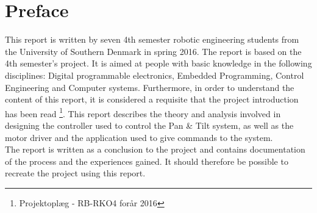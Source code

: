 \section*{Preface}

This report is written by seven 4th semester robotic engineering students from the University of Southern Denmark in spring 2016. The report is based on the 4th semester's project.
It is aimed at people with basic knowledge in the following disciplines: Digital programmable electronics, Embedded Programming, Control Engineering and Computer systems. Furthermore, in order to understand the content of this report, it is considered a requisite that the project introduction has been read \footnote{Projektoplæg - RB-RKO4 forår 2016}.
This report describes the theory and analysis involved in designing the controller used to control the Pan \& Tilt system, as well as the motor driver and the application used to give commands to the system.\\
The report is written as a conclusion to the project and contains documentation of the process and the experiences gained. It should therefore be possible to recreate the project using this report.